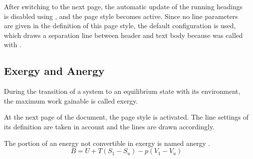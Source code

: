 \begin{Example}
  After switching to the next page, the automatic update of the running
  headings is disabled using , and the page style
   becomes active.  Since no line parameters are
  given in the definition of this page style, the default configuration
  is used, which draws a separation line between header and text body
  because  was called with .
\begin{lstcode}
  \manualmark
  \pagestyle{withoutLines}
  \section{Exergy and Anergy}
  During the transition of a system to an equilibrium state
  with its environment, the maximum work gainable is called
  exergy.
\end{lstcode}
  \begin{XmpTopPage}
    \thinlines{}
  \end{XmpTopPage}

  At the next page of the document, the page style  is
  activated.  The line settings of its definition are taken in account
  and the lines are drawn accordingly.
\begin{lstcode}
  \pagestyle{mitLinien}
  \renewcommand{\headfont}{\itshape\bfseries}
  The portion of an energy not convertible in exergy
  is named anergy .
  \[ B = U + T (S_1 - S_u) - p (V_1 - V_u)\] 
  
\end{lstcode}
  \begin{XmpTopPage}
    \thicklines{}
  \end{XmpTopPage}
\end{Example}


